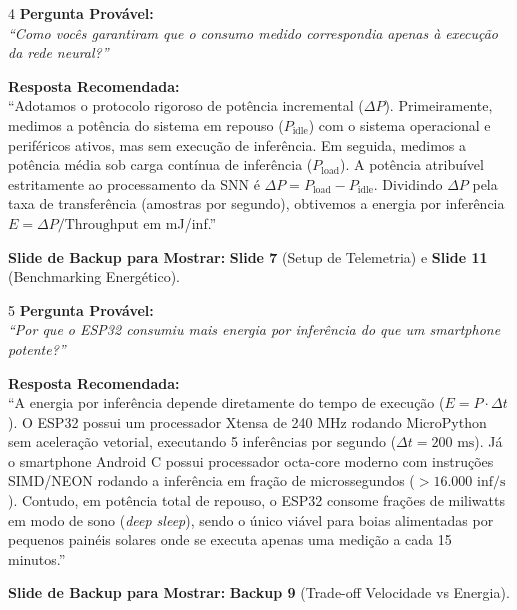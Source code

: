 \documentclass[11pt,a4paper]{article}
\begin{document}
\begin{qnabox}{4}
\textbf{Pergunta Provável:}\\
\textit{``Como vocês garantiram que o consumo medido correspondia apenas à execução da rede neural?''}

\vspace{0.2cm}
\textbf{Resposta Recomendada:}\\
``Adotamos o protocolo rigoroso de potência incremental ($\Delta P$). Primeiramente, medimos a potência do sistema em repouso ($P_{\text{idle}}$) com o sistema operacional e periféricos ativos, mas sem execução de inferência. Em seguida, medimos a potência média sob carga contínua de inferência ($P_{\text{load}}$). A potência atribuível estritamente ao processamento da SNN é $\Delta P = P_{\text{load}} - P_{\text{idle}}$. Dividindo $\Delta P$ pela taxa de transferência (amostras por segundo), obtivemos a energia por inferência $E = \Delta P / \text{Throughput}$ em mJ/inf.''

\vspace{0.2cm}
\textbf{Slide de Backup para Mostrar:} \textbf{Slide 7} (Setup de Telemetria) e \textbf{Slide 11} (Benchmarking Energético).
\end{qnabox}

\begin{qnabox}{5}
\textbf{Pergunta Provável:}\\
\textit{``Por que o ESP32 consumiu mais energia por inferência do que um smartphone potente?''}

\vspace{0.2cm}
\textbf{Resposta Recomendada:}\\
``A energia por inferência depende diretamente do tempo de execução ($E = P \cdot \Delta t$). O ESP32 possui um processador Xtensa de 240 MHz rodando MicroPython sem aceleração vetorial, executando 5 inferências por segundo ($\Delta t = 200\text{ ms}$). Já o smartphone Android C possui processador octa-core moderno com instruções SIMD/NEON rodando a inferência em fração de microssegundos ($> 16.000\text{ inf/s}$). Contudo, em potência total de repouso, o ESP32 consome frações de miliwatts em modo de sono (\textit{deep sleep}), sendo o único viável para boias alimentadas por pequenos painéis solares onde se executa apenas uma medição a cada 15 minutos.''

\vspace{0.2cm}
\textbf{Slide de Backup para Mostrar:} \textbf{Backup 9} (Trade-off Velocidade vs Energia).
\end{qnabox}
\end{document}
